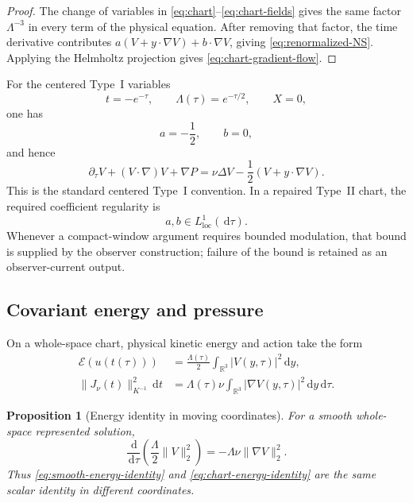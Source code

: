 \documentclass[11pt]{amsart}
\numberwithin{equation}{section}
\theoremstyle{plain}
\newtheorem{proposition}[proposition]{Proposition}
\theoremstyle{definition}
\theoremstyle{remark}
\newcommand{\R}{\mathbb R}
\newcommand{\dd}{\,\mathrm d}
\newcommand{\Energy}{\mathcal E}
\begin{document}
\begin{proof}
The change of variables in \eqref{eq:chart}--\eqref{eq:chart-fields} gives
the same factor \(\Lambda^{-3}\) in every term of the physical equation.
After removing that factor, the time derivative contributes
\(a(V+y\cdot\nabla V)+b\cdot\nabla V\), giving
\eqref{eq:renormalized-NS}.  Applying the Helmholtz projection gives
\eqref{eq:chart-gradient-flow}.
\end{proof}

For the centered Type~I variables
\[
 t=-e^{-\tau},\qquad \Lambda(\tau)=e^{-\tau/2},\qquad X=0,
\]
one has
\begin{equation}\label{eq:typeI-sign}
 a=-\frac12,\qquad b=0,
\end{equation}
and hence
\begin{equation}\label{eq:typeI-centered-equation}
 \partial_\tau V+(V\cdot\nabla)V+\nabla P
 =\nu\Delta V-\frac12(V+y\cdot\nabla V).
\end{equation}
This is the standard centered Type~I convention.  In a repaired Type~II
chart, the required coefficient regularity is
\begin{equation}\label{eq:typeII-ab-regularity}
 a,b\in L^1_{\mathrm{loc}}(\dd\tau).
\end{equation}
Whenever a compact-window argument requires bounded modulation, that bound is
supplied by the observer construction; failure of the bound is retained as an
observer-current output.

\subsection{Covariant energy and pressure}

On a whole-space chart, physical kinetic energy and action take the form
\begin{align}
 \Energy(u(t(\tau)))
 &=\frac{\Lambda(\tau)}2\int_{\R^3}|V(y,\tau)|^2\dd y,
 \label{eq:chart-energy}\\
 \|J_\nu(t)\|_{K^{-1}}^2\dd t
 &=\Lambda(\tau)\nu\int_{\R^3}|\nabla V(y,\tau)|^2\dd y\dd\tau.
 \label{eq:chart-action}
\end{align}

\begin{proposition}[Energy identity in moving coordinates]
\label{prop:chart-energy}
For a smooth whole-space represented solution,
\begin{equation}\label{eq:chart-energy-identity}
 \frac{\dd}{\dd\tau}
 \left(\frac{\Lambda}2\|V\|_2^2\right)
 =-\Lambda\nu\|\nabla V\|_2^2.
\end{equation}
Thus \eqref{eq:smooth-energy-identity} and
\eqref{eq:chart-energy-identity} are the same scalar identity in different
coordinates.
\end{proposition}
\end{document}
